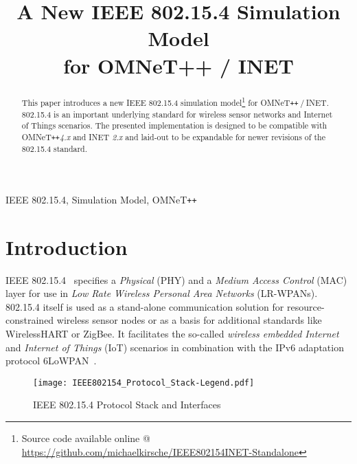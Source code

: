 \documentclass[conference,10pt]{IEEEtran}
\newcommand{\omnet}{{OMNeT\texttt{++}}\xspace}
\newcommand{\omnetinet}{{OMNeT\texttt{++$\:/\:$}INET}\xspace}
\begin{document}
\title{A New IEEE 802.15.4 Simulation Model \\ for OMNeT++ / INET}

\author{
}

\IEEEspecialpapernotice{\vspace{-1.5\baselineskip}}

\maketitle

\begin{abstract}
This paper introduces a new IEEE 802.15.4 simulation model\footnote{Source code available online @ \url{https://github.com/michaelkirsche/IEEE802154INET-Standalone}} for \omnetinet.
802.15.4 is an important underlying standard for wireless sensor networks and Internet of Things scenarios.
The presented implementation is designed to be compatible with \omnet \emph{4.x} and INET \emph{2.x} and laid-out to be expandable for newer revisions of the 802.15.4 standard.
\end{abstract}

\begin{keywords}
IEEE 802.15.4, Simulation Model, \omnet
\end{keywords}

\section{Introduction}
\label{sec:introduction}
IEEE 802.15.4~\cite{IEEE802154} specifies a \emph{Physical} (PHY) and a \emph{Medium Access Control} (MAC) layer for use in \emph{Low Rate Wireless Personal Area Networks} (LR-WPANs).
802.15.4 itself is used as a stand-alone communication solution for resource-constrained wireless sensor nodes or as a basis for additional standards like WirelessHART or ZigBee.
It facilitates the so-called \emph{wireless embedded Internet} and \emph{Internet of Things} (IoT) scenarios in combination with the IPv6 adaptation protocol 6LoWPAN~\cite{RFC6282}.

\begin{figure}[htb]
	\centering
	\texttt{[image: IEEE802154\_Protocol\_Stack-Legend.pdf]}
	\caption{IEEE 802.15.4 Protocol Stack and Interfaces}
	\label{fig:IEEE802154_Stack}
\end{figure}
\end{document}
